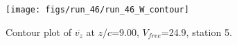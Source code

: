 \begin{figure}[H]
\centering
\texttt{[image: figs/run\_46/run\_46\_W\_contour]}
\caption{Contour plot of $\overline{v_{z}}$ at $z/c$=9.00, $V_{free}$=24.9, station 5.}
\label{fig:run_46_W_contour}
\end{figure}


